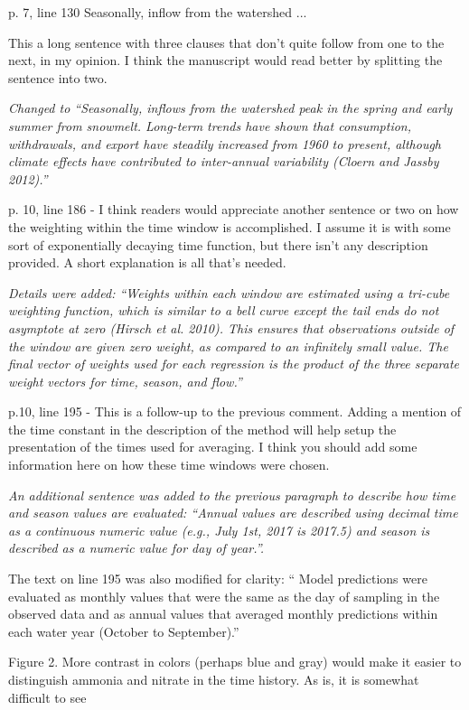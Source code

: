 \documentclass[letterpaper,12pt]{article}
\begin{document}
p. 7, line 130   Seasonally, inflow from the watershed ...

This a long sentence with three clauses that don't quite follow from one to the next, in my opinion.  I think the manuscript would read better by splitting the sentence into two.

{\it Changed to ``Seasonally, inflows from the watershed peak in the spring and early summer from snowmelt.  Long-term trends have shown that consumption, withdrawals, and export have steadily increased from 1960 to present, although climate effects have contributed to inter-annual variability (Cloern and Jassby 2012).''}

p. 10, line 186 - I think readers would appreciate another sentence or two on how the weighting within the time window is accomplished.  I assume it is with some sort of exponentially decaying time function, but there isn't any description provided.  A short explanation is all that's needed.  

{\it Details were added: ``Weights within each window are estimated using a tri-cube weighting function, which is similar to a bell curve except the tail ends do not asymptote at zero (Hirsch et al. 2010).  This ensures that observations outside of the window are given zero weight, as compared to an infinitely small value.  The final vector of weights used for each regression is the product of the three separate weight vectors for time, season, and flow.''}

p.10, line 195 - This is a follow-up to the previous comment.  Adding a mention of the time constant in the description of the method will help setup the presentation of the times used for averaging.  I think you should add some information here on how these time windows were chosen.

{\it An additional sentence was added to the previous paragraph to describe how time and season values are evaluated: ``Annual values are described using decimal time as a continuous numeric value (e.g., July 1st, 2017 is 2017.5) and season is described as a numeric value for day of year.''. 

The text on line 195 was also modified for clarity: `` Model predictions were evaluated as monthly values that were the same as the day of sampling in the observed data and as annual values that averaged monthly predictions within each water year (October to September).''
}

Figure 2.  More contrast in colors (perhaps blue and gray) would make it easier to distinguish ammonia and nitrate in the time history.  As is, it is somewhat difficult to see
\end{document}
